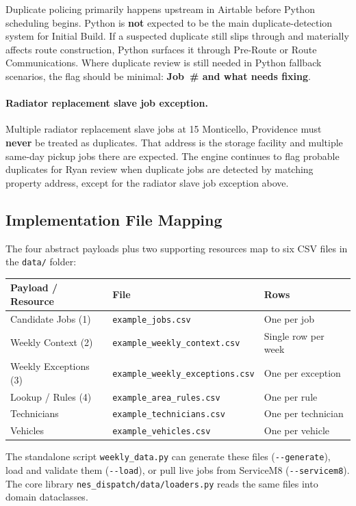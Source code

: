 \documentclass[12pt]{article}
\begin{document}
Duplicate policing primarily happens upstream in Airtable before Python scheduling begins.
Python is \textbf{not} expected to be the main duplicate-detection system for Initial Build.
If a suspected duplicate still slips through and materially affects route construction, Python surfaces it through Pre-Route or Route Communications.
Where duplicate review is still needed in Python fallback scenarios, the flag should be minimal: \textbf{Job~\# and what needs fixing}.

\paragraph{Radiator replacement slave job exception.}
Multiple radiator replacement slave jobs at 15 Monticello, Providence must \textbf{never} be treated as duplicates.
That address is the storage facility and multiple same-day pickup jobs there are expected.
The engine continues to flag probable duplicates for Ryan review when duplicate jobs are detected by matching property address, except for the radiator slave job exception above.

\subsection*{Implementation File Mapping}
The four abstract payloads plus two supporting resources map to six CSV files
in the \texttt{data/} folder:

\medskip
{\small
\begin{tabular}{lll}
\toprule
\textbf{Payload / Resource} & \textbf{File} & \textbf{Rows} \\
\midrule
Candidate Jobs (1)  & \texttt{example\_jobs.csv}                & One per job \\
Weekly Context (2)   & \texttt{example\_weekly\_context.csv}     & Single row per week \\
Weekly Exceptions (3) & \texttt{example\_weekly\_exceptions.csv} & One per exception \\
Lookup / Rules (4)   & \texttt{example\_area\_rules.csv}         & One per rule \\
Technicians          & \texttt{example\_technicians.csv}         & One per technician \\
Vehicles             & \texttt{example\_vehicles.csv}            & One per vehicle \\
\bottomrule
\end{tabular}
}

\medskip
The standalone script \texttt{weekly\_data.py} can generate these files
(\texttt{-{}-generate}), load and validate them (\texttt{-{}-load}), or pull
live jobs from ServiceM8 (\texttt{-{}-servicem8}).  The core library
\texttt{nes\_dispatch/data/loaders.py} reads the same files into domain
dataclasses.
\end{document}
